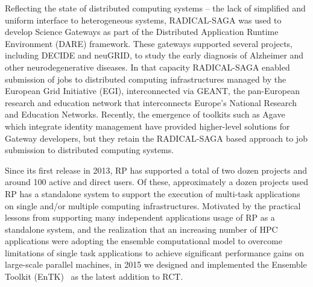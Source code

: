 \documentclass[preprint,12pt, a4paper]{elsarticle}
\begin{document}


Reflecting the state of distributed computing systems -- the lack of
simplified and uniform interface to heterogeneous systems, RADICAL-SAGA was
used to develop Science Gateways as part of the Distributed Application
Runtime Environment (DARE) framework. These gateways supported several
projects, including DECIDE and neuGRID, to study the early diagnosis of
Alzheimer and other neurodegenerative diseases. In that capacity RADICAL-SAGA
enabled submission of jobs to distributed computing infrastructures managed
by the European Grid Initiative (EGI), interconnected via GEANT, the
pan-European research and education network that interconnects Europe’s
National Research and Education Networks. Recently, the emergence of toolkits
such as Agave which integrate identity management have provided higher-level
solutions for Gateway developers, but they retain the RADICAL-SAGA based
approach to job submission to distributed computing systems.




Since its first release in 2013, RP has supported a total of two dozen
projects and around 100 active and direct users. Of these, approximately a
dozen projects used RP has a standalone system to support the execution of
multi-task applications on single and/or multiple computing infrastructures.
Motivated by the practical lessons from supporting many independent
applications usage of RP as a standalone system, and the realization that an
increasing number of HPC applications were adopting the ensemble
computational model to overcome limitations of single task applications to
achieve significant performance gains on large-scale parallel machines, in
2015 we designed and implemented the Ensemble Toolkit
(EnTK)~\citep{balasubramanian2016extasy} as the latest addition to RCT.
\end{document}
